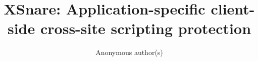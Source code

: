 \documentclass[letterpaper,twocolumn,10pt]{article}
\newcommand{\sys}[0]{XSnare\xspace}
\begin{document}
	
\date{}

\title{\Large \bf \sys: Application-specific client-side cross-site scripting protection}

\author{
	{\rm Anonymous author(s)}
}
\maketitle




\acresetall	%
















\end{document}
